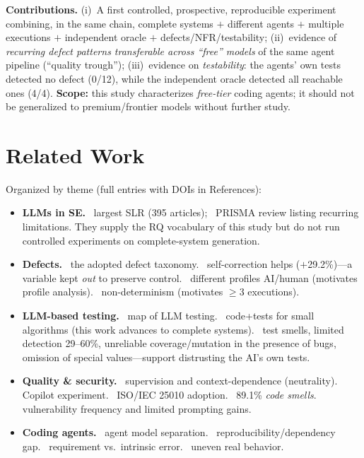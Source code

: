 \documentclass[10pt,twocolumn]{article}
\begin{document}
\textbf{Contributions.} (i)~A first controlled, prospective, reproducible experiment combining, in the same chain, complete systems $+$ different agents $+$ multiple executions $+$ independent oracle $+$ defects/NFR/testability; (ii)~evidence of \emph{recurring defect patterns transferable across ``free'' models} of the same agent pipeline (``quality trough''); (iii)~evidence on \emph{testability}: the agents' own tests detected no defect (0/12), while the independent oracle detected all reachable ones (4/4). \textbf{Scope:} this study characterizes \emph{free-tier} coding agents; it should not be generalized to premium/frontier models without further study.

\section{Related Work}

Organized by theme (full entries with DOIs in References):

\begin{itemize}
\item \textbf{LLMs in SE.}~\cite{A01} largest SLR (395 articles);~\cite{A02} PRISMA review listing recurring limitations. They supply the RQ vocabulary of this study but do not run controlled experiments on complete-system generation.
\item \textbf{Defects.}~\cite{B01} the adopted defect taxonomy.~\cite{B02} self-correction helps ($+$29.2\%)---a variable kept \emph{out} to preserve control.~\cite{B03} different profiles AI/human (motivates profile analysis).~\cite{B04} non-determinism (motivates $\ge$3 executions).
\item \textbf{LLM-based testing.}~\cite{C01} map of LLM testing.~\cite{C02} code+tests for small algorithms (this work advances to complete systems).~\cite{C03,C04,C05,C06} test smells, limited detection 29--60\%, unreliable coverage/mutation in the presence of bugs, omission of special values---support distrusting the AI's own tests.
\item \textbf{Quality \& security.}~\cite{D01,D02} supervision and context-dependence (neutrality).~\cite{D03} Copilot experiment.~\cite{D04} ISO/IEC 25010 adoption.~\cite{D05} 89.1\% \emph{code smells}.~\cite{E01,E02,E03} vulnerability frequency and limited prompting gains.
\item \textbf{Coding agents.}~\cite{F01} agent model separation.~\cite{F02} reproducibility/dependency gap.~\cite{F03} requirement vs.\ intrinsic error.~\cite{F04,F05} uneven real behavior.
\end{itemize}
\end{document}
